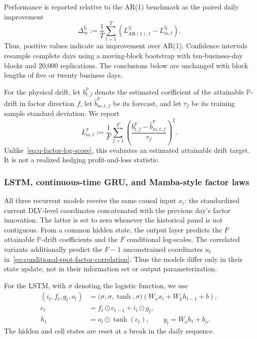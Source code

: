 \documentclass[11pt]{article}
\newcommand{\Q}{\mathbb Q}
\newcommand{\PP}{\mathbb P}
\theoremstyle{plain}
\theoremstyle{definition}
\theoremstyle{remark}
\begin{document}
Performance is reported relative to the AR(1) benchmark as the paired daily
improvement
\begin{equation}
  \Delta_m^\Q
  :=
  \frac{1}{T}\sum_{t=1}^T
  \left(L^\Q_{\mathrm{AR}(1),t}-L^\Q_{m,t}\right).
  \label{eq:q-factor-skill}
\end{equation}
Thus, positive values indicate an improvement over AR(1).  Confidence
intervals resample complete days using a moving-block bootstrap with
ten-business-day blocks and 20,000 replications.  The conclusions below are
unchanged with block lengths of five or twenty business days.

For the physical drift, let $b^\PP_{t,f}$ denote the estimated coefficient
of the attainable $\PP$-drift in factor direction $f$, let
$\widehat b^\PP_{m,t,f}$ be its forecast, and let $\tau_f$ be its training
sample standard deviation.  We report
\begin{equation}
  L^\PP_{m,t}
  :=
  \frac{1}{F}\sum_{f=1}^F
  \left(
    \frac{b^\PP_{t,f}-\widehat b^\PP_{m,t,f}}{\tau_f}
  \right)^2.
  \label{eq:p-drift-target-score}
\end{equation}
Unlike~\eqref{eq:q-factor-log-score}, this evaluates an estimated attainable
drift target.  It is not a realized hedging profit-and-loss statistic.

\subsubsection{LSTM, continuous-time GRU, and Mamba-style factor laws}

All three recurrent models receive the same causal input $x_t$: the standardized
current DLV-level coordinates concatenated with the previous day's factor
innovation.  The latter is set to zero whenever the historical panel is not
contiguous.  From a common hidden state, the output layer predicts the $F$
attainable $\PP$-drift coefficients and the $F$ conditional log-scales.  The
correlated variants additionally predict the $F-1$ unconstrained coordinates
$u_t$ in~\eqref{eq:conditional-spot-factor-correlation}.  Thus the models
differ only in their state update, not in their information set or output
parameterization.

For the LSTM, with $\sigma$ denoting the logistic function, we use
\begin{align}
  (i_t,f_t,g_t,o_t)
    &=\bigl(\sigma,\sigma,\tanh,\sigma\bigr)
      \left(W_xx_t+W_hh_{t-1}+b\right), \\
  c_t&=f_t\odot c_{t-1}+i_t\odot g_t, \\
  h_t&=o_t\odot\tanh(c_t),
  \qquad y_t=W_oh_t+b_o.
  \label{eq:lstm-factor-law}
\end{align}
The hidden and cell states are reset at a break in the daily sequence.
\end{document}
